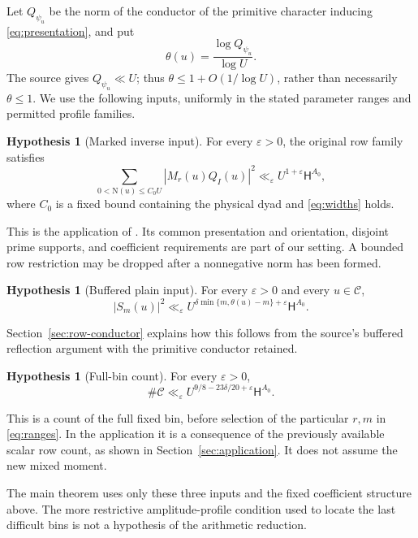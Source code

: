 \documentclass[11pt]{article}
\theoremstyle{definition}
\newtheorem{hypothesis}[theorem]{Hypothesis}
\theoremstyle{remark}
\numberwithin{equation}{section}
\newcommand{\Nm}{\mathrm N}
\newcommand{\CC}{\mathcal C}
\newcommand{\HH}{\mathsf H}
\newcommand{\ee}{\varepsilon}
\begin{document}
Let $Q_{\psi_u}$ be the norm of the conductor of the primitive
character inducing \eqref{eq:presentation}, and put
\[
\theta(u)=\frac{\log Q_{\psi_u}}{\log U}.
\]
The source gives $Q_{\psi_u}\ll U$; thus
$\theta\le1+O(1/\log U)$, rather than necessarily $\theta\le1$.
We use the following inputs, uniformly in the stated parameter ranges
and permitted profile families.

\begin{hypothesis}[Marked inverse input]\label{hyp:inverse}
For every $\ee>0$, the original row family satisfies
\begin{equation}\label{eq:inverse-input}
\sum_{0<\Nm(u)\le C_0U}|M_r(u)Q_I(u)|^2
\ll_\ee U^{1+\ee}\HH^{A_0},
\end{equation}
where $C_0$ is a fixed bound containing the physical dyad and
\eqref{eq:widths} holds.
\end{hypothesis}

This is the application of \cite[Lemma 17.1]{openai}. Its common
presentation and orientation, disjoint prime supports, and coefficient
requirements are part of our setting. A bounded row restriction may be
dropped after a nonnegative norm has been formed.

\begin{hypothesis}[Buffered plain input]\label{hyp:plain}
For every $\ee>0$ and every $u\in\CC$,
\begin{equation}\label{eq:plain-input}
|S_m(u)|^2\ll_\ee
U^{\delta\min\{m,\theta(u)-m\}+\ee}\HH^{A_0}.
\end{equation}
\end{hypothesis}

Section~\ref{sec:row-conductor} explains how this follows from the
source's buffered reflection argument with the primitive conductor
retained.

\begin{hypothesis}[Full-bin count]\label{hyp:count}
For every $\ee>0$,
\begin{equation}\label{eq:count-input}
\#\CC\ll_\ee U^{9/8-23\delta/20+\ee}\HH^{A_0}.
\end{equation}
\end{hypothesis}

This is a count of the full fixed bin, before selection of the
particular $r,m$ in \eqref{eq:ranges}. In the application it is a
consequence of the previously available scalar row count, as shown
in Section~\ref{sec:application}. It does not assume the new mixed
moment.

The main theorem uses only these three inputs and the fixed coefficient
structure above. The more restrictive amplitude-profile condition
used to locate the last difficult bins is not a hypothesis of the
arithmetic reduction.
\end{document}
